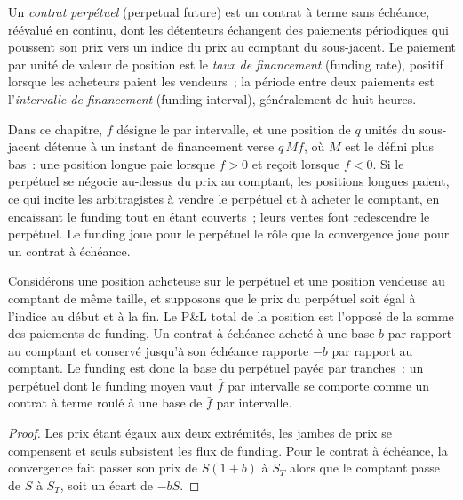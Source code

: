 \begin{definition}\label{def:m3:perpetual-futures:perp}
Un \emph{contrat perpétuel} (perpetual future) est un contrat à terme sans échéance, réévalué en continu,
dont les détenteurs échangent des paiements périodiques qui poussent son prix vers un indice du
prix au comptant du sous-jacent. Le paiement par unité de valeur de position est le \emph{taux de
financement} (funding rate), positif lorsque les acheteurs paient les vendeurs~; la période entre deux
paiements est l'\emph{intervalle de financement} (funding interval), généralement de huit heures.
\end{definition}

Dans ce chapitre, $f$ désigne le  par intervalle, et une position de $q$ unités du
sous-jacent détenue à un instant de financement verse $q\,M f$, où $M$ est le  défini plus bas~: une position longue paie
lorsque $f > 0$ et reçoit lorsque $f < 0$. Si le perpétuel se négocie au-dessus du prix au comptant, les positions longues paient, ce qui
incite les arbitragistes à vendre le perpétuel et à acheter le comptant, en encaissant le funding tout en étant couverts~; leurs
ventes font redescendre le perpétuel. Le funding joue pour le perpétuel le rôle que la convergence joue pour un contrat à échéance.

\begin{proposition}\label{prop:m3:perpetual-futures:roll}
Considérons une position acheteuse sur le perpétuel et une position vendeuse au comptant de même taille, et supposons que le prix du perpétuel soit égal
à l'indice au début et à la fin. Le P\&L total de la position est l'opposé de la somme des paiements de funding. Un contrat à
échéance acheté à une base $b$ par rapport au comptant et conservé jusqu'à son échéance rapporte $-b$ par rapport au comptant. Le funding est
donc la base du perpétuel payée par tranches~: un perpétuel dont le funding moyen vaut $\bar f$ par intervalle
se comporte comme un contrat à terme roulé à une base de $\bar f$ par intervalle.
\end{proposition}

\begin{proof}
Les prix étant égaux aux deux extrémités, les jambes de prix se compensent et seuls subsistent les flux de funding. Pour le
contrat à échéance, la convergence fait passer son prix de $S(1+b)$ à $S_T$ alors que le comptant passe de $S$ à $S_T$, soit un écart de $-bS$.
\end{proof}

